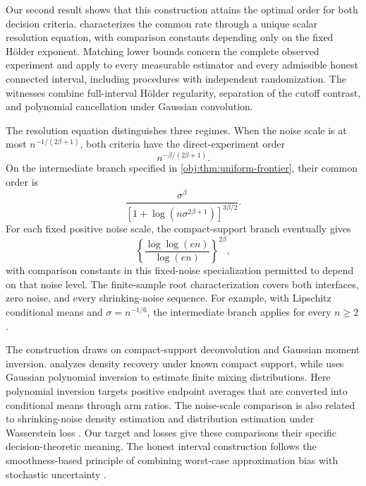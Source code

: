 \documentclass[11pt]{article}
\begin{document}
Our second result shows that this construction attains the optimal order for both decision criteria.  characterizes the common rate through a unique scalar resolution equation, with comparison constants depending only on the fixed Hölder exponent. Matching lower bounds concern the complete observed experiment and apply to every measurable estimator and every admissible honest connected interval, including procedures with independent randomization. The witnesses combine full-interval Hölder regularity, separation of the cutoff contrast, and polynomial cancellation under Gaussian convolution.

The resolution equation distinguishes three regimes. When the noise scale is at most \(n^{-1/(2\beta+1)}\), both criteria have the direct-experiment order
\[
n^{-\beta/(2\beta+1)}.
\]
On the intermediate branch specified in \cref{obj:thm:uniform-frontier}, their common order is
\[
\frac{\sigma^\beta}
{[1+\log(n\sigma^{2\beta+1})]^{3\beta/2}}.
\]
For each fixed positive noise scale, the compact-support branch eventually gives
\[
\left\{\frac{\log\log(en)}{\log(en)}\right\}^{2\beta},
\]
with comparison constants in this fixed-noise specialization permitted to depend on that noise level. The finite-sample root characterization covers both interfaces, zero noise, and every shrinking-noise sequence. For example, with Lipschitz conditional means and \(\sigma=n^{-1/6}\), the intermediate branch applies for every \(n\ge2\).

The construction draws on compact-support deconvolution and Gaussian moment inversion. \citet[Theorem~1(a), fixed-support case]{Meister2007CompactSupport} analyzes density recovery under known compact support, while \citet[Theorem~1; Section~4.1]{WuYang2020DenoisedMoments} uses Gaussian polynomial inversion to estimate finite mixing distributions. Here polynomial inversion targets positive endpoint averages that are converted into conditional means through arm ratios. The noise-scale comparison is also related to shrinking-noise density estimation \citep[Theorems~2.1 and 2.2]{Delaigle2008ShrinkingNoise} and distribution estimation under Wasserstein loss \citep[Section~2, Theorems~2.4--2.6]{DurotMukherjee2026VanishingNoise}. Our target and losses give these comparisons their specific decision-theoretic meaning. The honest interval construction follows the smoothness-based principle of combining worst-case approximation bias with stochastic uncertainty \citep{ArmstrongKolesar2018OptimalInference,ArmstrongKolesar2020SimpleHonest}.
\end{document}
